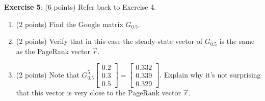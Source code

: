 \documentclass{article}
\begin{document}
\textbf{Exercise 5}: (6 points) Refer back to Exercise 4.

\begin{enumerate}[label=\alph*.]

  \item (2 points) Find the Google matrix $G_{0.5}$.

  \item (2 points) Verify that in this case the steady-state vector of $G_{0.5}$ is the same as the PageRank vector $\vec{r}$.

  \item (2 points) Note that $G_{0.5}^5 \begin{bmatrix}
            0.2 \\
            0.3 \\
            0.5
          \end{bmatrix} = \begin{bmatrix}
            0.332 \\
            0.339 \\
            0.329
          \end{bmatrix}$. Explain why it's not surprising that this vector is very close to the PageRank vector $\vec{r}$.

\end{enumerate}

\pagebreak
\printbibliography
\end{document}
